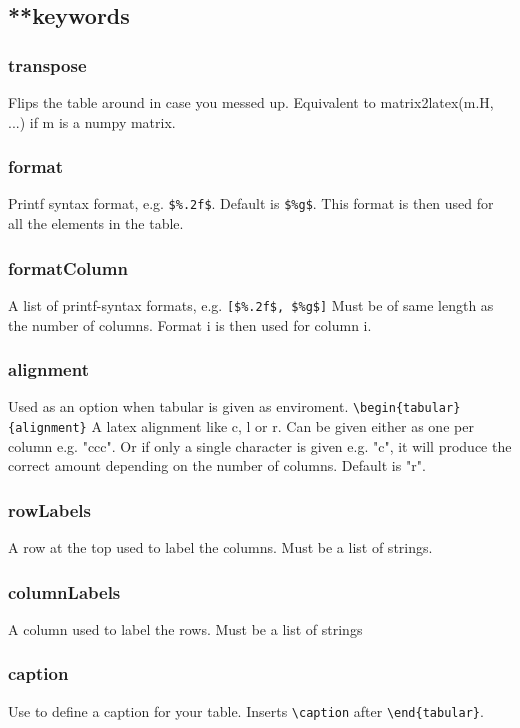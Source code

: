 \subsection{**keywords}
\subsubsection{transpose}
  Flips the table around in case you messed up. Equivalent to
  matrix2latex(m.H, ...)
  if m is a numpy matrix.
  
\subsubsection{format}
  Printf syntax format, e.g. \lstinline{$%.2f$}. Default is \lstinline{$%g$}.
  This format is then used for all the elements in the table.
  
\subsubsection{formatColumn}
  A list of printf-syntax formats, e.g. \lstinline{[$%.2f$, $%g$]}
  Must be of same length as the number of columns.
  Format i is then used for column i.
  
\subsubsection{alignment}
  Used as an option when tabular is given as enviroment.
  \verb!\begin{tabular}{alignment}!
    A latex alignment like c, l or r.
    Can be given either as one per column e.g. "ccc".
    Or if only a single character is given e.g. "c",
    it will produce the correct amount depending on the number of columns.
    Default is "r".

\subsubsection{rowLabels}
    A row at the top used to label the columns.
    Must be a list of strings.

\subsubsection{columnLabels}
    A column used to label the rows.
    Must be a list of strings

\subsubsection{caption}
    Use to define a caption for your table.
    Inserts \verb!\caption! after \verb!\end{tabular}!.

